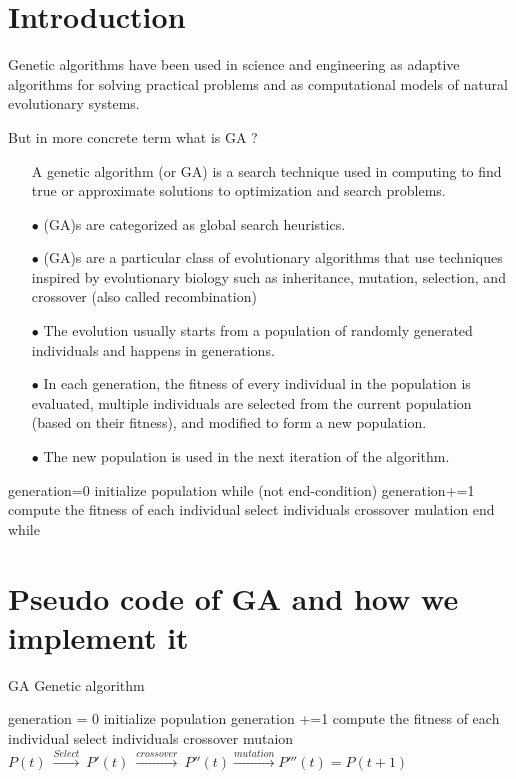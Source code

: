 

\section{Introduction}

Genetic algorithms have been used in science and engineering as adaptive algorithms for solving practical problems and as computational models of natural evolutionary systems.

But in more concrete term what is GA ?
\begin{itemize}
\item[] A genetic algorithm (or GA) is a search technique
used in computing to find true or approximate
solutions to optimization and search problems.
\item[$ \bullet $](GA)s are categorized as global search heuristics.
\item[$ \bullet $](GA)s are a particular class of evolutionary algorithms that use techniques inspired by
evolutionary biology such as inheritance,
mutation, selection, and crossover (also called
recombination)
\item[$ \bullet $] The evolution usually starts from a population
of randomly generated individuals and
happens in generations. 
\item[$ \bullet $] In each generation, the fitness of every
individual in the population is evaluated,
multiple individuals are selected from the
current population (based on their fitness), and
modified to form a new population.
\item[$ \bullet $] The new population is used in the next iteration
of the algorithm.\cite{Generalintro}
\end{itemize}
generation=0
initialize population
while (not end-condition)
generation+=1
compute the fitness of each individual
select individuals
crossover
mulation
end while

\section{Pseudo code of GA and how we implement it}
\begin{algorithm}
\caption{GA Genetic algorithm}\label{GAalgorithm}
	\begin{algorithmic}[1]
		\State generation = 0
		\State initialize population
		\State generation +=1
		\State compute the fitness of each individual
		\State select individuals
		\State crossover
		\State mutaion
		\EndWhile\\
		{	$P(t)\ \xrightarrow[]{Select}\ P'(t)\ \xrightarrow[]{crossover}\ P''(t)\xrightarrow[]{mutation} P'''(t) = P(t+1)$}
	\end{algorithmic}
\end{algorithm}

